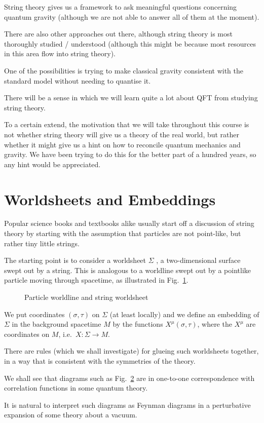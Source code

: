 String theory gives us a framework to ask meaningful questions concerning quantum gravity (although we are not able to answer all of them at the moment).

There are also other approaches out there, although string theory is most thoroughly studied / understood (although this might be because most resources in this area flow into string theory).

One of the possibilities is trying to make classical gravity consistent with the standard model without needing to quantise it.

There will be a sense in which we will learn quite a lot about QFT from studying string theory.

To a certain extend, the motivation that we will take throughout this course is not whether string theory will give us a theory of the real world, but rather whether it might give us a hint on how to reconcile quantum mechanics and gravity. We have been trying to do this for the better part of a hundred years, so any hint would be appreciated.

\section{Worldsheets and Embeddings}%
\label{sec:worldsheets_and_embeddings}

Popular science books and textbooks alike usually start off a discussion of string theory by starting with the assumption that particles are not point-like, but rather tiny little strings.

The starting point is to consider a worldsheet $\Sigma$ , a two-dimensional surface swept out by a string. This is analogous to a worldline swept out by a pointlike particle moving through spacetime, as illustrated in Fig.~\ref{fig:l1f1}.
\begin{figure}[tbhp]
  \centering
  \def\svgwidth{0.4\columnwidth}
  
  \caption{Particle worldline and string worldsheet}
  \label{fig:l1f1}
\end{figure}

We put coordinates $(\sigma, \tau)$  on $\Sigma$  (at least locally) and we define an embedding of $\Sigma$ in the background spacetime $M$ by the functions $X^{\mu}(\sigma, \tau)$, where the $X^{\mu}$ are coordinates on $M$, i.e.~$X \colon \Sigma \to M$.

There are rules (which we shall investigate) for glueing such worldsheets together, in a way that is consistent with the symmetries of the theory.

We shall see that diagrams such as Fig.~\ref{fig:l1f2} are in one-to-one correspondence with correlation functions in some quantum theory.
\begin{figure}[tbhp]
  \centering
  \def\svgwidth{0.4\columnwidth}
  
  \caption{}
  \label{fig:l1f2}
\end{figure}
It is natural to interpret such diagrams as Feynman diagrams in a perturbative expansion of some theory about a vacuum.
